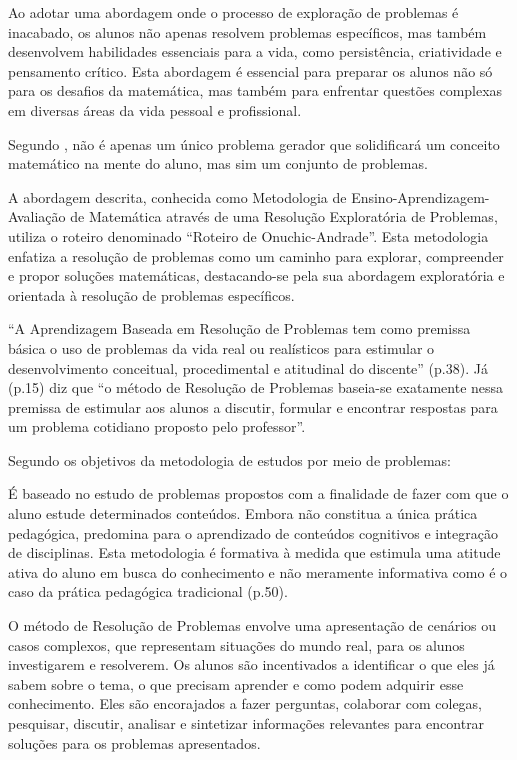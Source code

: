 Ao adotar uma abordagem onde o processo de exploração de problemas é inacabado, os alunos não apenas resolvem problemas específicos, mas também desenvolvem habilidades essenciais para a vida, como persistência, criatividade e pensamento crítico. Esta abordagem é essencial para preparar os alunos não só para os desafios da matemática, mas também para enfrentar questões complexas em diversas áreas da vida pessoal e profissional.

Segundo , não é apenas um único problema gerador que solidificará um conceito matemático na mente do aluno, mas sim um conjunto de problemas.

A abordagem descrita, conhecida como Metodologia de Ensino-Aprendizagem-Avaliação de Matemática através de uma Resolução Exploratória de Problemas, utiliza o roteiro denominado ``Roteiro de Onuchic-Andrade''. Esta metodologia enfatiza a resolução de problemas como um caminho para explorar, compreender e propor soluções matemáticas, destacando-se pela sua abordagem exploratória e orientada à resolução de problemas específicos.

``A Aprendizagem Baseada em Resolução de Problemas tem como premissa básica o uso de problemas da vida real ou realísticos para estimular o desenvolvimento conceitual, procedimental e atitudinal do discente''  (p.38). Já  (p.15) diz que ``o método de Resolução de Problemas baseia-se exatamente nessa premissa de estimular aos alunos a discutir, formular e encontrar respostas para um problema cotidiano proposto pelo professor''.

Segundo  os objetivos da metodologia de estudos por meio de problemas:

\begin{citacao}
    É baseado no estudo de problemas propostos com a finalidade de fazer com que o aluno estude determinados conteúdos. Embora não constitua a única prática pedagógica, predomina para o aprendizado de conteúdos cognitivos e integração de disciplinas. Esta metodologia é formativa à medida que estimula uma atitude ativa do aluno em busca do conhecimento e não meramente informativa como é o caso da prática pedagógica tradicional \cite{TANGERINO2017} (p.50).
\end{citacao}

O método de Resolução de Problemas envolve uma apresentação de cenários ou casos complexos, que representam situações do mundo real, para os alunos investigarem e resolverem. Os alunos são incentivados a identificar o que eles já sabem sobre o tema, o que precisam aprender e como podem adquirir esse conhecimento. Eles são encorajados a fazer perguntas, colaborar com colegas, pesquisar, discutir, analisar e sintetizar informações relevantes para encontrar soluções para os problemas apresentados.

